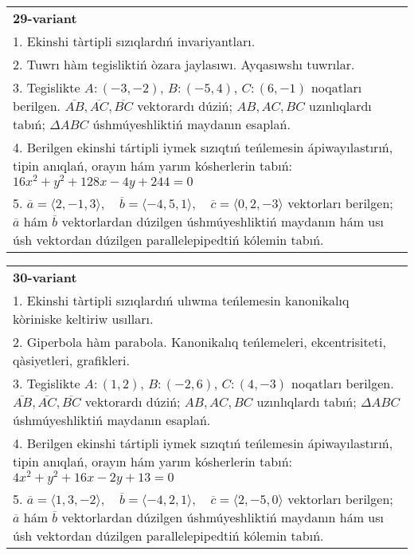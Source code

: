 \documentclass{article}
\begin{document}
\begin{tabular}{m{17cm}}
\textbf{29-variant}\\
1. Ekinshi tàrtipli sızıqlardıń invariyantları.\\

2. Tuwrı hàm tegisliktiń òzara jaylasıwı. Ayqasıwshı tuwrılar.\\

3. Tegislikte $A: (-3, -2)$, $B: (-5, 4)$, $C: (6, -1)$ noqatları berilgen. $\overline{AB}, \overline{AC}, \overline{BC}$ vektorardı dúziń; $AB, AC, BC$ uzınlıqlardı tabıń; $\Delta ABC$ úshmúyeshliktiń maydanın esaplań. \\

4. Berilgen ekinshi tártipli iymek sızıqtıń teńlemesin ápiwayılastırıń, tipin anıqlań, orayın hám yarım kósherlerin tabıń: $16x^2+y^2+128x-4y+244=0$\\

5. \(\overline{a} = \langle 2, -1, 3 \rangle, \quad \overline{b} = \langle -4, 5, 1 \rangle, \quad \overline{c} = \langle 0, 2, -3 \rangle\) vektorları berilgen; \(\overline{a}\) hám \(\overline{b}\) vektorlardan dúzilgen úshmúyeshliktiń maydanın hám usı úsh vektordan dúzilgen parallelepipedtiń kólemin tabıń.
\end{tabular}
\vspace{1cm}


\begin{tabular}{m{17cm}}
\textbf{30-variant}\\
1. Ekinshi tàrtipli sızıqlardıń ulıwma teńlemesin kanonikalıq kòriniske keltiriw usılları.\\

2. Giperbola hàm parabola. Kanonikalıq teńlemeleri, ekcentrisiteti, qàsiyetleri, grafikleri.\\

3. Tegislikte $A: (1, 2)$, $B: (-2, 6)$, $C: (4, -3)$ noqatları berilgen. $\overline{AB}, \overline{AC}, \overline{BC}$ vektorardı dúziń; $AB, AC, BC$ uzınlıqlardı tabıń; $\Delta ABC$ úshmúyeshliktiń maydanın esaplań. \\

4. Berilgen ekinshi tártipli iymek sızıqtıń teńlemesin ápiwayılastırıń, tipin anıqlań, orayın hám yarım kósherlerin tabıń: $4x^2+y^2+16x-2y+13=0$\\

5. \(\overline{a} = \langle 1, 3, -2 \rangle, \quad \overline{b} = \langle -4, 2, 1 \rangle, \quad \overline{c} = \langle 2, -5, 0 \rangle\) vektorları berilgen; \(\overline{a}\) hám \(\overline{b}\) vektorlardan dúzilgen úshmúyeshliktiń maydanın hám usı úsh vektordan dúzilgen parallelepipedtiń kólemin tabıń.
\end{tabular}
\vspace{1cm}
\end{document}
